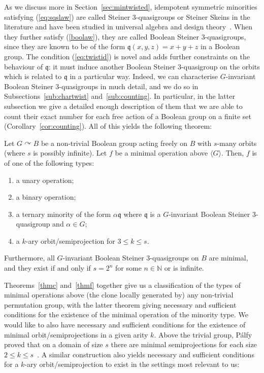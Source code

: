 \documentclass{article}
\newenvironment{customthm}[1]
  {\renewcommand\theinnercustomthm{#1}\innercustomthm}
  {\endinnercustomthm}
\theoremstyle{remark}
\theoremstyle{definition}
\def\acts{\curvearrowright}
\begin{document}
As we discuss more in Section~\ref{sec:mintwisted}, idempotent symmetric minorities satisfying (\ref{eq:sqslaw}) are called Steiner $3$-quasigroups or Steiner Skeins in the literature and have been studied in universal algebra and design theory~\cite{quackenbush1975algebraic, armanious1980algebraische, lindner1978steiner}. When they further satisfy  (\ref{boolaw}), they are called Boolean Steiner $3$-quasigroups, since they are known to be of the form $\mathfrak{q}(x,y,z)=x+y+z$ in a Boolean group. The condition (\ref{eq:twistid}) is novel and adds further constraints on the behaviour of $\mathfrak{q}$: it must induce another Boolean Steiner $3$-quasigroup on the orbits which is related to $\mathfrak{q}$ in a particular way. Indeed, we can characterise $G$-invariant Boolean Steiner $3$-quasigroups in much detail, and we do so in Subsections~\ref{sub:chartwist} and~\ref{sub:counting}. In particular, in the latter subsection we give a detailed enough description of them that we are able to count their exact number for each free action of a Boolean group on a finite set (Corollary~\ref{cor:counting}). All of this yields the following theorem:

\begin{customthm}{F}[Theorem~\ref{Boolminclass}, minimal operations, Boolean case] \label{thmf} Let $G\acts B$ be a non-trivial Boolean group acting freely on $B$ with $s$-many orbits (where $s$ is possibly infinite). Let $f$ be a minimal operation above $\langle G \rangle$. Then,  $f$ is of one of the following types:
\begin{enumerate}
    \item a unary operation;
    \item a binary operation;
    \item a ternary minority of the form $\alpha \mathfrak{q}$ where $\mathfrak{q}$ is a $G$-invariant Boolean Steiner $3$-quasigroup and $\alpha\in G$;
    \item a $k$-ary orbit\-/semiprojection for $3\leq k \leq s$.
\end{enumerate} 
Furthermore, all $G$-invariant Boolean Steiner $3$-quasigroups on $B$ are minimal, and they exist if and only if $s=2^n$ for some $n\in\mathbb{N}$ or is infinite.
\end{customthm}

Theorems~\ref{thmc} and~\ref{thmf} together give us a classification of the types of minimal operations above (the clone locally generated by) any  non-trivial permutation group, with the latter theorem giving necessary and sufficient conditions for the existence of the minimal operation of the minority type. We would like to also have necessary and sufficient conditions for the existence of minimal orbit\-/semiprojections in a given arity $k$. Above the trivial group, P\'{a}lfy proved that on a domain of size $s$ there are minimal semiprojections for each size $2\leq k\leq s$~\cite{palfy1986arity}. A similar construction also yields necessary and sufficient conditions for a $k$-ary orbit\-/semiprojection to exist in the settings most relevant to us:
\end{document}
